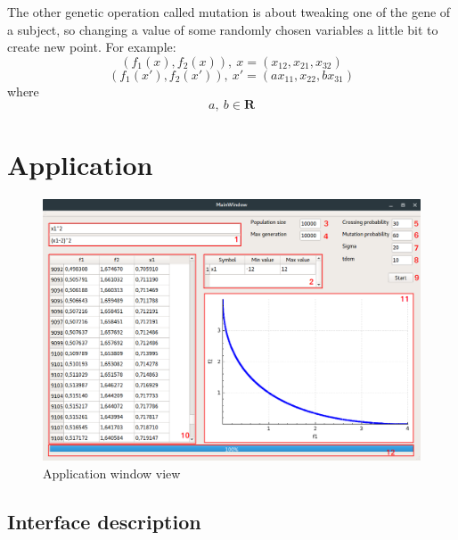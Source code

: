 \documentclass[a4paper, 11pt]{article}
\begin{document}
	The other genetic operation called mutation is about tweaking one of the gene of
	a subject, so changing a value of some randomly chosen variables a little bit to 
	create new point. For example:
	$$(f_{1}(x), f_{2}(x)),\ x=(x_{12}, x_{21}, x_{32})$$
	$$(f_{1}(x'), f_{2}(x')),\ x'=(ax_{11}, x_{22}, bx_{31})$$
	where
	$$a,\ b\in \boldsymbol{R}$$
	
	\newpage	
	\section{Application}
	\begin{figure}[H]
	\centering
	\includegraphics[scale=0.35]{application}
	\caption{Application window view}
	\label{fig:app_window}
	\end{figure}
	
	\subsection{Interface description}	
	
\end{document}

